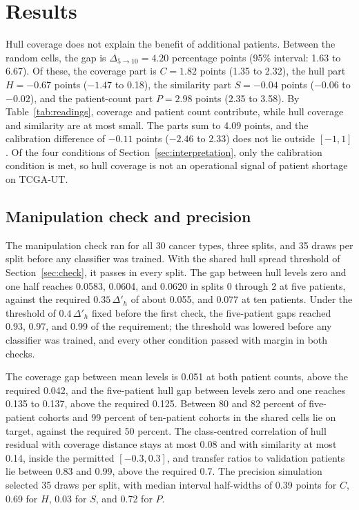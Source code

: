 \section{Results}
\label{sec:results}
Hull coverage does not explain the benefit of additional patients. Between the random cells, the gap is $\Delta_{5\to10}=4.20$ percentage points (95\% interval: 1.63 to 6.67). Of these, the coverage part is $C=1.82$ points (1.35 to 2.32), the hull part $H=-0.67$ points ($-1.47$ to 0.18), the similarity part $S=-0.04$ points ($-0.06$ to $-0.02$), and the patient-count part $P=2.98$ points (2.35 to 3.58). By Table~\ref{tab:readings}, coverage and patient count contribute, while hull coverage and similarity are at most small. The parts sum to 4.09 points, and the calibration difference of $-0.11$ points ($-2.46$ to 2.33) does not lie outside $[-1,1]$. Of the four conditions of Section~\ref{sec:interpretation}, only the calibration condition is met, so hull coverage is not an operational signal of patient shortage on TCGA-UT.

\subsection{Manipulation check and precision}
\label{sec:check-results}
The manipulation check ran for all 30 cancer types, three splits, and 35 draws per split before any classifier was trained. With the shared hull spread threshold of Section~\ref{sec:check}, it passes in every split. The gap between hull levels zero and one half reaches 0.0583, 0.0604, and 0.0620 in splits 0 through 2 at five patients, against the required $0.35\,\Delta'_h$ of about 0.055, and 0.077 at ten patients. Under the threshold of $0.4\,\Delta'_h$ fixed before the first check, the five-patient gaps reached 0.93, 0.97, and 0.99 of the requirement; the threshold was lowered before any classifier was trained, and every other condition passed with margin in both checks.

The coverage gap between mean levels is 0.051 at both patient counts, above the required 0.042, and the five-patient hull gap between levels zero and one reaches 0.135 to 0.137, above the required 0.125. Between 80 and 82 percent of five-patient cohorts and 99 percent of ten-patient cohorts in the shared cells lie on target, against the required 50 percent. The class-centred correlation of hull residual with coverage distance stays at most 0.08 and with similarity at most 0.14, inside the permitted $[-0.3,0.3]$, and transfer ratios to validation patients lie between 0.83 and 0.99, above the required 0.7. The precision simulation selected 35 draws per split, with median interval half-widths of 0.39 points for $C$, 0.69 for $H$, 0.03 for $S$, and 0.72 for $P$.

